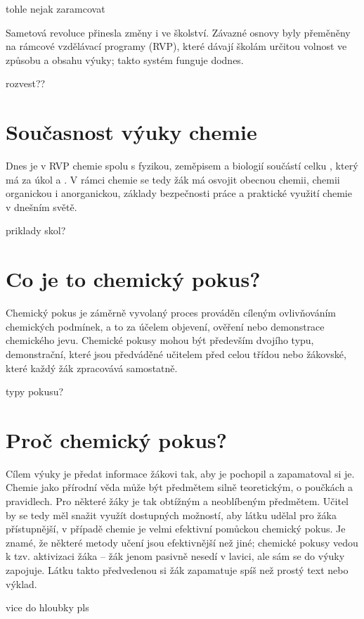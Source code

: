 tohle nejak zaramcovat

Sametová revoluce přinesla změny i ve školství. Závazné osnovy byly přeměněny na rámcové vzdělávací programy (RVP), které dávají školám určitou volnost ve způsobu a obsahu výuky; takto systém funguje dodnes.

rozvest??

\section{Současnost výuky chemie}
Dnes je v RVP chemie spolu s fyzikou, zeměpisem a biologií součástí celku , který má za úkol \cite{rvp_g} a \cite{rvp_zv}. V rámci chemie se tedy žák má osvojit obecnou chemii, chemii organickou i anorganickou, základy bezpečnosti práce a praktické využití chemie v dnešním světě.\cite{rvp_g}\cite{rvp_zv}

priklady skol?

\section{Co je to chemický pokus?}
Chemický pokus je záměrně vyvolaný proces prováděn cíleným ovlivňováním chemických podmínek, a to za účelem objevení, ověření nebo demonstrace chemického jevu.\cite{badani} Chemické pokusy mohou být především dvojího typu, demonstrační, které jsou předváděné učitelem před celou třídou nebo žákovské, které každý žák zpracovává samostatně.

typy pokusu?

\section{Proč chemický pokus?}
Cílem výuky je předat informace žákovi tak, aby je pochopil a zapamatoval si je. Chemie jako přírodní věda může být předmětem silně teoretickým, o poučkách a pravidlech. Pro některé žáky je tak obtížným a neoblíbeným předmětem.\cite{oblibenost} Učitel by se tedy měl snažit využít dostupných možností, aby látku udělal pro žáka přístupnější, v případě chemie je velmi efektivní pomůckou chemický pokus. Je znamé, že některé metody učení jsou efektivnější než jiné; chemické pokusy vedou k tzv. aktivizaci žáka -- žák jenom pasivně nesedí v lavici, ale sám se do výuky zapojuje. Látku takto předvedenou si žák zapamatuje spíš než prostý text nebo výklad.\cite{badani}

vice do hloubky pls
